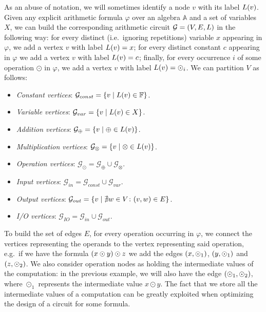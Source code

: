 As an abuse of notation, we will sometimes identify a node \(v\) with its label \(\call{L}{v}\).
Given any explicit arithmetic formula \(\varphi \) over an algebra \(\mathbb{A}\) and a set of 
variables \(X\), we can build the corresponding arithmetic circuit \(\mathcal{G} = \Tuple{V, E, L}\) 
in the following way: for every distinct (i.e.\ ignoring repetitions) variable \(x\) appearing 
in \(\varphi \), we add a vertex \(v\) with label \(\call{L}{v} = x\); 
for every distinct constant \(c\) appearing in \(\varphi \) we add a vertex \(v\) with label 
\(\call{L}{v} = c\); 
finally, for every occurrence \(i\) of some operation \(\odot \) in \(\varphi \), we add a vertex
\(v\) with label \(\call{L}{v} = \odot_{i}\).
We can partition \(V\) as follows:
\begin{itemize}
  \item \emph{Constant vertices}: 
    \(\mathcal{G}_{const} = \Set{v \mid \call{L}{v} \in \mathbb{F}}\).
  \item \emph{Variable vertices}: 
    \(\mathcal{G}_{var} = \Set{v \mid \call{L}{v} \in X}\).
  \item \emph{Addition vertices}: 
    \(\mathcal{G}_{\oplus} = \Set{v \mid \oplus \in \call{L}{v}}\).
  \item \emph{Multiplication vertices}: 
    \(\mathcal{G}_{\otimes} = \Set{v \mid \otimes \in \call{L}{v}}\).
    \item \emph{Operation vertices}:
    \(\mathcal{G}_{\odot} = \mathcal{G}_{\oplus} \cup \mathcal{G}_{\otimes}\).
  \item \emph{Input vertices}: 
    \(\mathcal{G}_{in} = \mathcal{G}_{const} \cup \mathcal{G}_{var}\).
  \item \emph{Output vertices}: 
    \(\mathcal{G}_{out} = \Set{v \mid \nexists w \in V\colon \Tuple{v, w} \in E}\).
  \item \emph{I/O vertices}: \(\mathcal{G}_{IO} = \mathcal{G}_{in} \cup \mathcal{G}_{out}\).
\end{itemize}

To build the set of edges \(E\), for every operation occurring in \(\varphi \), we connect the 
vertices representing the operands to the vertex representing said operation, e.g.\ if we have 
the formula \(\Parens*{x \odot y} \odot z\) we add the edges \(\Tuple{x, \odot_1}\), 
\(\Tuple{y, \odot_1}\) and \(\Tuple{z, \odot_2}\).
We also consider operation nodes as holding the intermediate values of the computation: in the 
previous example, we will also have the edge \(\Tuple{\odot_1, \odot_2}\), where \(\odot_1 \) 
represents the intermediate value \(x \odot y\).
The fact that we store all the intermediate values of a computation can be greatly exploited when
optimizing the design of a circuit for some formula.

